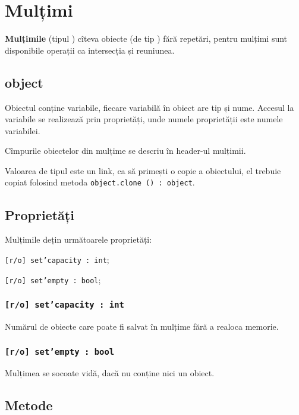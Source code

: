 \section{Mulțimi}

{\bf Mulțimile} (tipul \set) cîteva obiecte (de tip \object) fără repetări, pentru mulțimi sunt disponibile operații ca intersecția și reuniunea.

\subsection{{\color{lightblue} object}}

Obiectul conține variabile, fiecare variabilă în obiect are tip și nume. Accesul la variabile se realizează prin proprietăți, unde numele proprietății este numele variabilei.

Cîmpurile obiectelor din mulțime se descriu în header-ul mulțimii.

Valoarea de tipul \object{} este un link, ca să primești o copie a obiectului, el trebuie copiat folosind metoda \texttt{object.clone () : object}.

\subsection{Proprietăți}

Mulțimile dețin următoarele proprietăți:
\begin{icItems}
\item \texttt{[r/o] set'capacity : int};
\item \texttt{[r/o] set'empty : bool};
\end{icItems}

\subsubsection{\texttt{[r/o] set'capacity : int}}

Numărul de obiecte care poate fi salvat în mulțime fără a realoca memorie.

\subsubsection{\texttt{[r/o] set'empty : bool}}

Mulțimea se socoate vidă, dacă nu conține nici un obiect.

\subsection{Metode}

